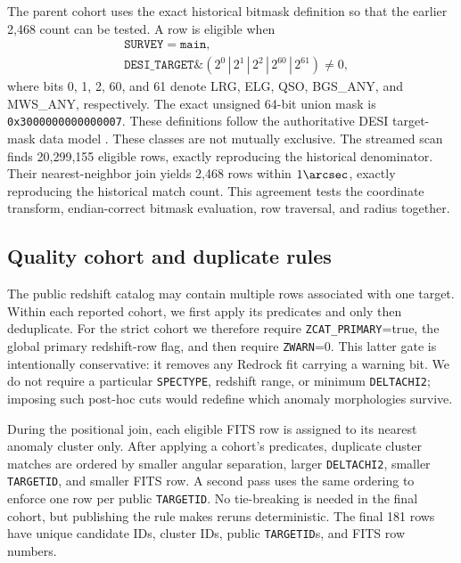 \documentclass[twocolumn,linenumbers]{aastex702}
\begin{document}
The parent cohort uses the exact historical bitmask definition so that the earlier 2,468 count
can be tested.  A row is eligible when
\begin{equation}
\begin{split}
&\texttt{SURVEY}=\texttt{main},\\
&\texttt{DESI\_TARGET}\mathbin{\&}
\left(2^0\,|\,2^1\,|\,2^2\,|\,2^{60}\,|\,2^{61}\right)\ne0,
\end{split}
\end{equation}
where bits 0, 1, 2, 60, and 61 denote LRG, ELG, QSO, BGS\_ANY, and MWS\_ANY, respectively.
The exact unsigned 64-bit union mask is \texttt{0x3000000000000007}.
These definitions follow the authoritative DESI target-mask data model \citep{DESIBitmasks}.
These classes are not mutually exclusive.  The streamed scan finds 20,299,155 eligible rows,
exactly reproducing the historical denominator.  Their nearest-neighbor join yields 2,468 rows
within $1\arcsec$, exactly reproducing the historical match count.  This agreement tests the
coordinate transform, endian-correct bitmask evaluation, row traversal, and radius together.

\subsection{Quality cohort and duplicate rules}\label{sec:quality-selection}

The public redshift catalog may contain multiple rows associated with one target.  Within each
reported cohort, we first apply its predicates and only then deduplicate.  For the strict cohort
we therefore require \texttt{ZCAT\_PRIMARY}=true, the global primary redshift-row flag, and then
require
\texttt{ZWARN}=0.  This latter gate is intentionally conservative: it removes any Redrock fit
carrying a warning bit.  We do not require a particular \texttt{SPECTYPE}, redshift range, or
minimum \texttt{DELTACHI2}; imposing such post-hoc cuts would redefine which anomaly morphologies
survive.

During the positional join, each eligible FITS row is assigned to its nearest anomaly cluster
only.  After applying a cohort's predicates, duplicate cluster matches are ordered by smaller angular separation, larger
\texttt{DELTACHI2}, smaller \texttt{TARGETID}, and smaller FITS row.  A second pass uses the same
ordering to enforce one row per public \texttt{TARGETID}.  No tie-breaking is needed in the final
cohort, but publishing the rule makes reruns deterministic.  The final 181 rows have unique
candidate IDs, cluster IDs, public \texttt{TARGETID}s, and FITS row numbers.
\end{document}
